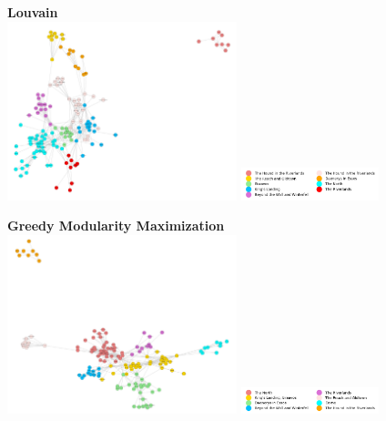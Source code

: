 \documentclass[10pt,twocolumn,letterpaper]{article}
\begin{document}
\begin{center}
    \textbf{Louvain} \\
    \includegraphics[width=0.5\textwidth]{img/s6/communities_louvain.jpg}
    \includegraphics[width=0.3\textwidth]{img/s6/louvain_legend.jpg}\\
    \caption{\small{$\#communities=9$, $modularity=0.655$}}
\end{center}



\begin{center}
    \textbf{Greedy Modularity Maximization}\\
    \includegraphics[width=0.5\textwidth]{img/s6/communities_gmm.jpg}
    \includegraphics[width=0.3\textwidth]{img/s6/gmm_legend.jpg}\\
    \caption{\small{$\#communities=8$, $modularity=0.634$}}
\end{center}
\end{document}
